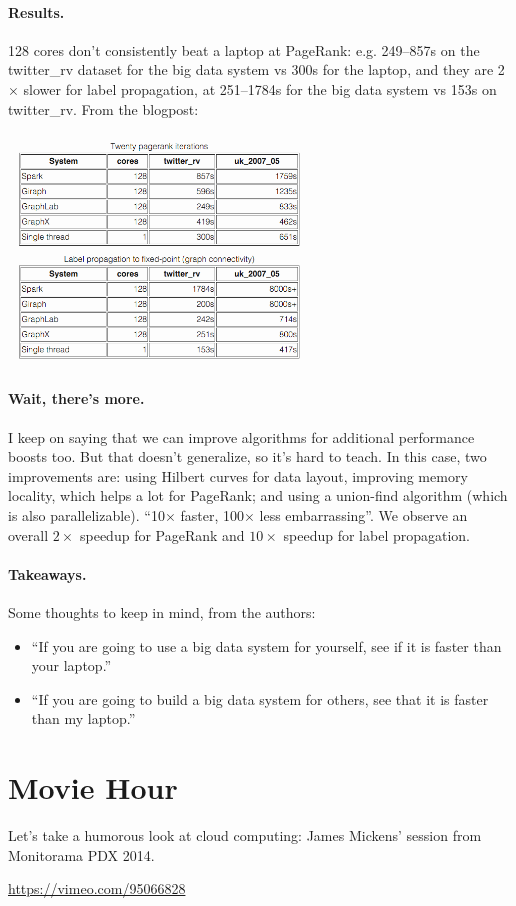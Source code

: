 \paragraph{Results.} 128 cores don't consistently beat a laptop at PageRank: e.g. 249--857s on the twitter\_rv dataset for the big data system vs 300s for the laptop, and they are 2$\times$ slower for label
propagation, at 251--1784s for the big data system vs 153s on
twitter\_rv. From the blogpost:

\begin{center}
	\includegraphics[width=0.60\textwidth]{images/pagerank.png}
\end{center}

\paragraph{Wait, there's more.} I keep on saying that we can improve algorithms for additional performance boosts too.
But that doesn't generalize, so it's hard to teach. In this case, two improvements are: using Hilbert curves
for data layout, improving memory locality, which helps a lot for PageRank; and using a union-find algorithm 
(which is also parallelizable). ``10$\times$ faster, 100$\times$ less embarrassing''.  We observe an overall
$2\times$ speedup for PageRank and $10\times$ speedup for label propagation.

\paragraph{Takeaways.} Some thoughts to keep in mind, from the authors:
\begin{itemize}
\item    ``If you are going to use a big data system for yourself, see if it is faster than your laptop.''
\item    ``If you are going to build a big data system for others, see that it is faster than my laptop.''
\end{itemize}



\section*{Movie Hour}
Let's take a humorous look at cloud computing: James Mickens' session from Monitorama PDX 2014. 

\begin{center}
\url{https://vimeo.com/95066828}
\end{center}




